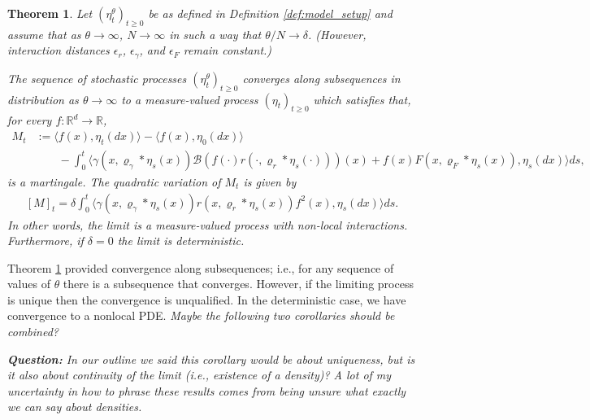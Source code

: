 \documentclass[12pt]{article}
\newtheorem{theorem}{Theorem}[section]
\newcommand{\kernel}{\varrho}  %
\newcommand{\smooth}[1]{\kernel_{#1} \! * \!}  %
\newcommand{\comment}[1]{{\color{blue} \it #1}}
\begin{document}
\begin{theorem} \label{thm:nonlocal_convergence}
    Let $(\eta^\theta_t)_{t \geq 0}$
    be as defined in Definition \ref{def:model_setup}
    and assume that as $\theta \to \infty$, $N \to \infty$
    in such a way that $\theta/N \to \delta$.
    (However, interaction distances $\epsilon_r$, $\epsilon_\gamma$, and $\epsilon_F$
    remain constant.)

    The sequence of stochastic processes
    $(\eta^\theta_t)_{t \geq 0}$
    converges along subsequences in distribution as $\theta \to \infty$
    to a measure-valued process $(\eta_t)_{t \geq 0}$
    which satisfies that, for every $f:\mathbb{R}^d \rightarrow \mathbb{R}$,
    \begin{align} \label{eqn:mgale_problem}
        M_t
        &:=
        \langle f(x), \eta_t(dx) \rangle
        -
        \langle f(x), \eta_0(dx) \rangle
        \\ & \qquad
        -
        \int_0^t \big\langle
            \gamma(x, \smooth{\gamma} \eta_{s}(x))
            \mathcal{B}\left(
                f(\cdot) r(\cdot, \smooth{r} \eta_{s}(\cdot))
            \right)(x)
            +
            f(x)
            F(x, \smooth{F} \eta_{s}(x)),
            \eta_{s}(dx)
        \big\rangle ds,
    \end{align}
    is a martingale.
    The quadratic variation of $M_t$ is given by 
    \begin{align} \label{eqn:mgale_variation}
        [ M ]_t
        =
        \delta
        \int_0^t
        \big\langle
            \gamma\left( x, \smooth{\gamma} \eta_{s}(x) \right)
            r\left(x, \smooth{r} \eta_{s}(x) \right)
            f^2(x),
            \eta_{s} (dx)
        \big\rangle ds. 
    \end{align}
    In other words, the limit is a measure-valued process with non-local interactions.
    Furthermore, if $\delta = 0$ the limit is deterministic.
\end{theorem}

Theorem \ref{thm:nonlocal_convergence} provided convergence along subsequences;
i.e., for any sequence of values of $\theta$
there is a subsequence that converges.
However, if the limiting process is unique then the convergence is unqualified.
In the deterministic case, we have convergence to a nonlocal PDE.
\comment{Maybe the following two corollaries should be combined?}

\comment{
    \textbf{Question:}
    In our outline
    we said this corollary would be about uniqueness,
    but is it also about continuity of the limit (i.e., existence of a density)?
    A lot of my uncertainty in how to phrase these results
    comes from being unsure what exactly we can say about densities.
}
\end{document}
